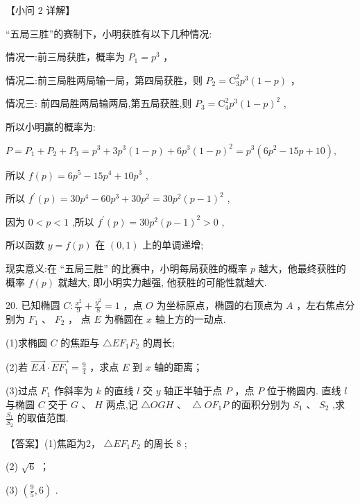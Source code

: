 \documentclass[10pt]{article}
\begin{document}
【小问 2 详解】

“五局三胜”的赛制下，小明获胜有以下几种情况:

情况一:前三局获胜，概率为 \({P}_{1} = {p}^{3}\) ，

情况二:前三局胜两局输一局，第四局获胜，则 \({P}_{2} = {\mathrm{C}}_{3}^{2}{p}^{3}\left( {1 - p}\right)\) ，

情况三: 前四局胜两局输两局,第五局获胜,则 \({P}_{3} = {\mathrm{C}}_{4}^{2}{p}^{3}{\left( 1 - p\right) }^{2}\) ,

所以小明赢的概率为:

\(P = {P}_{1} + {P}_{2} + {P}_{3} = {p}^{3} + 3{p}^{3}\left( {1 - p}\right)  + 6{p}^{3}{\left( 1 - p\right) }^{2} = {p}^{3}\left( {6{p}^{2} - {15p} + {10}}\right) ,\)

所以 \(f\left( p\right)  = 6{p}^{5} - {15}{p}^{4} + {10}{p}^{3}\) ,

所以 \({f}^{\prime }\left( p\right)  = {30}{p}^{4} - {60}{p}^{3} + {30}{p}^{2} = {30}{p}^{2}{\left( p - 1\right) }^{2}\) ,

因为 \(0 < p < 1\) ,所以 \({f}^{\prime }\left( p\right)  = {30}{p}^{2}{\left( p - 1\right) }^{2} > 0\) ,

所以函数 \(y = f\left( p\right)\) 在 \(\left( {0,1}\right)\) 上的单调递增;

现实意义:在 “五局三胜” 的比赛中，小明每局获胜的概率 \(p\) 越大，他最终获胜的概率 \(f\left( p\right)\) 就越大, 即小明实力越强, 他获胜的可能性就越大.

20. 已知椭圆 \(C : \frac{{x}^{2}}{9} + \frac{{y}^{2}}{8} = 1\) ，点 \(O\) 为坐标原点，椭圆的右顶点为 \(A\) ，左右焦点分别为 \({F}_{1}\) 、 \({F}_{2}\) ， 点 \(E\) 为椭圆在 \(x\) 轴上方的一动点.

(1)求椭圆 \(C\) 的焦距与 \({\bigtriangleup E}{F}_{1}{F}_{2}\) 的周长;

(2)若 \(\overrightarrow{EA} \cdot  \overrightarrow{E{F}_{1}} = \frac{9}{4}\) ，求点 \(E\) 到 \(x\) 轴的距离；

(3)过点 \({F}_{1}\) 作斜率为 \(k\) 的直线 \(l\) 交 \(y\) 轴正半轴于点 \(P\) ，点 \(P\) 位于椭圆内. 直线 \(l\) 与椭圆 \(C\) 交于 \(G\text{ 、 }H\) 两点,记 \(\bigtriangleup {OGH}\text{ 、 }\bigtriangleup O{F}_{1}P\) 的面积分别为 \({S}_{1}\text{ 、 }{S}_{2}\) ,求 \(\frac{{S}_{1}}{{S}_{2}}\) 的取值范围.

【答案】(1)焦距为2， \(\bigtriangleup E{F}_{1}{F}_{2}\) 的周长 8 ;

(2) \(\sqrt{6}\) ；

(3) \(\left( {\frac{9}{5},6}\right)\) .
\end{document}
